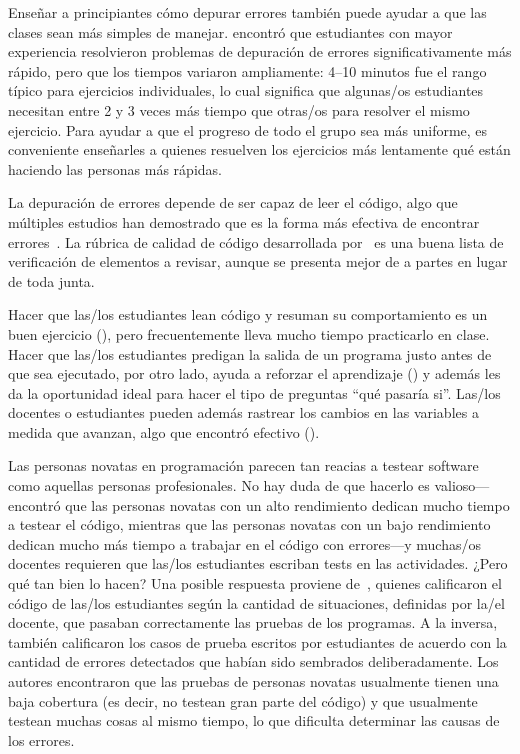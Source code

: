 Enseñar a principiantes cómo depurar errores también puede ayudar a que las clases sean más simples de manejar.
\cite{Alqa2017} encontró que estudiantes con mayor experiencia resolvieron problemas de depuración de errores significativamente más rápido,
pero que los tiempos variaron ampliamente:
4--10 minutos fue el rango típico para ejercicios individuales,
lo cual significa que algunas/os estudiantes necesitan entre 2 y 3 veces más tiempo que otras/os para resolver el mismo ejercicio.
Para ayudar a que el progreso de todo el grupo sea más uniforme,
es conveniente enseñarles a quienes resuelven los ejercicios más lentamente qué están haciendo las personas más rápidas.

La depuración de errores depende de ser capaz de leer el código,
algo que múltiples estudios han demostrado que es la forma más efectiva de encontrar errores~\cite{Basi1987,Keme2009,Bacc2013}.
La rúbrica de calidad de código desarrollada por~\cite{Steg2014,Steg2016a}
es una buena lista de verificación de elementos a revisar,
aunque se presenta mejor de a partes  en lugar  de toda junta.

Hacer que las/los estudiantes lean código y resuman su comportamiento es un buen ejercicio (),
pero frecuentemente lleva mucho tiempo practicarlo en clase.
Hacer que las/los estudiantes predigan la salida de un programa justo antes de que sea ejecutado,
por otro lado,
ayuda a reforzar el aprendizaje ()
y además les da la oportunidad ideal para hacer el tipo de preguntas ``qué pasaría si''.
Las/los docentes o estudiantes pueden además rastrear los cambios en las variables a medida que avanzan,
algo que \cite{Cunn2017} encontró efectivo ().



Las personas novatas en programación parecen tan reacias a testear software como aquellas personas profesionales.
No hay duda de que hacerlo es valioso---\cite{Cart2017} encontró que
las personas novatas con un alto rendimiento dedican mucho tiempo a testear el código,
mientras que las personas novatas con un bajo rendimiento dedican mucho más tiempo a trabajar en el código con errores---y muchas/os docentes
requieren que las/los estudiantes escriban tests en las actividades.
¿Pero qué tan bien lo hacen?
Una posible respuesta proviene de~\cite{Bria2015},
quienes calificaron el código de las/los estudiantes según la cantidad de situaciones, definidas por la/el docente, que pasaban correctamente las pruebas de los programas.
A la inversa, también calificaron
los casos de prueba escritos por estudiantes de acuerdo con la cantidad de errores detectados que habían sido sembrados deliberadamente.
Los autores encontraron que las pruebas de personas novatas usualmente tienen una baja cobertura (es decir, no testean gran parte del código)
y que usualmente testean muchas cosas al mismo tiempo, lo que dificulta determinar las causas de los errores.

